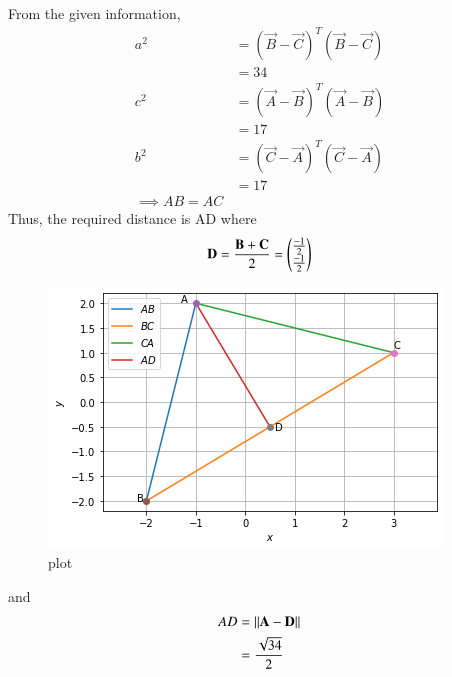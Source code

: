 
From the given information, 
\begin{align}
    a^2 &= (\vec{B} - \vec{C})^T(\vec{B} - \vec{C}) \\
    &= 34\\
    c^2 &= (\vec{A} - \vec{B})^T(\vec{A} - \vec{B}) \\
    &= 17\\
    b^2 &= (\vec{C} - \vec{A})^T(\vec{C} - \vec{A}) \\
    &= 17\\
    \implies AB = AC
\end{align}
Thus, the required distance is AD where
\begin{align}
     \mathbf{D}= \frac{\mathbf{B} + \mathbf{C}}{2} = \begin{pmatrix}\frac{-1}{2}\\ \frac{-1}{2}\end{pmatrix}
\end{align}
\begin{figure}[htp]
    \centering
    \includegraphics[width=\columnwidth]{solutions/1/1/7/figure/Assignment_1.png}
    \caption{plot}
    \label{rams/1/1/7/fig:my_label}
\end{figure}
and 
\begin{align}
    AD &= \left\lVert\mathbf{A} - \mathbf{D}\right\rVert \\    
    &= \frac{\sqrt{34}}{2}
\end{align}



